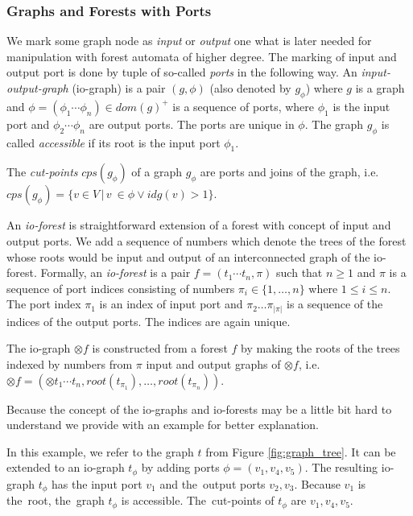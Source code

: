 \documentclass[a4paper, 12pt]{article}
\begin{document}
\subsubsection{Graphs and Forests with Ports}
\label{subsec:gfp}

We mark some graph node as \emph{input} or \emph{output} one what is later needed for manipulation
with forest automata of higher degree.
The marking of input and output port is done by tuple of so-called \emph{ports} in the following way.
An \emph{input-output-graph} (io-graph) is a pair $(g,\phi)$ (also denoted by $g_\phi$)
where $g$ is a graph and $\phi=(\phi_1 \cdots \phi_n) \in dom(g)^+$ is a sequence of ports,
where $\phi_1$ is the input port and $\phi_2 \cdots \phi_n$ are output ports.
The ports are unique in $\phi$.
The graph $g_\phi$ is called \emph{accessible} if its root is the input port $\phi_1$.

The \emph{cut-points} $cps(g_\phi)$ of a graph $g_\phi$ are ports and joins of the graph,
i.e. $cps(g_\phi)=\{v \in V\,|\, v~\in \phi \vee idg(v) > 1\}$.

An \emph{io-forest} is straightforward extension of a forest with concept of input and output ports.
We add a sequence of numbers which denote the trees of the forest whose roots would
be input and output of an interconnected graph of the io-forest.
Formally, an \emph{io-forest} is a pair $f=(t_1 \cdots t_n, \pi)$ such that $n \geq 1$ and $\pi$
is a sequence of port indices consisting of numbers $\pi_i \in \{1,\ldots,n\}$ where $1 \leq i \leq n$.
The port index $\pi_1$ is an index of input port and $\pi_2 \ldots \pi_{|\pi|}$ is a sequence of
the indices of the output ports.
The indices are again unique.

The io-graph $\otimes f$ is constructed from a forest $f$ by making
the roots of the trees indexed by numbers from $\pi$ input and output graphs
of $\otimes f$, i.e. $\otimes f = (\otimes t_1 \cdots t_n,root(t_{\pi_{1}}),\ldots,root(t_{\pi_{n}}))$.

Because the concept of the io-graphs and io-forests may be a little bit
hard to understand we provide with an example for better explanation.

\bexmp
In this example, we refer to the graph $t$ from Figure \ref{fig:graph_tree}.
It can be extended to an io-graph $t_\phi$ by adding ports $\phi=(v_1,v_4,v_5)$.
The resulting io-graph $t_\phi$ has the input port $v_1$ and the~output ports $v_2,v_3$.
Because $v_1$ is the~root, the~graph $t_\phi$ is accessible.
The~cut-points of $t_\phi$ are $v_1, v_4, v_5$.
\end{document}
